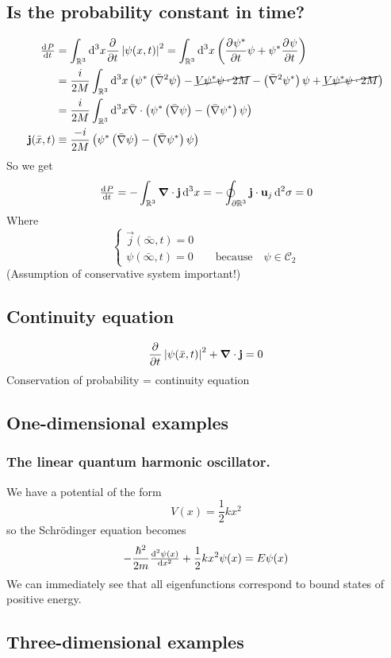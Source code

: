 \subsection{Is the probability constant in time?}
\begin{align*}
\od{P}{t} &= \int_{\R^3}\diff{^3x}\pd{}{t}\left|\psi(x,t)\right|^2 = \int_{\R^3}\diff{^3x}\left(\pd{\psi^*}{t}\psi + \psi^*\pd{\psi}{t}\right) \\
&= \frac{i}{2M}\int_{\R^3} \diff{^3x}\left(\psi^*\left(\bar{\nabla}^2\psi\right)- \cancel{V\psi^*\psi\cdot2M} - \left(\bar{\nabla}^2\psi^*\right)\psi + \cancel{V\psi^*\psi\cdot2M}\right) \\
&= \frac{i}{2M}\int_{\R^3}\diff{^3x}\bar{\nabla}\cdot \left(\psi^*\left(\bar{\nabla}\psi\right)- \left(\bar{\nabla}\psi^*\right)\psi\right) \\
\vec{j}(\bar{x},t) &\equiv \frac{-i}{2M}\left(\psi^*\left(\bar{\nabla}\psi\right)- \left(\bar{\nabla}\psi^*\right)\psi\right)
\end{align*}
So we get
\[ \od{P}{t} = -\int_{\R^3}\vec{\nabla}\cdot \vec{j}\diff{^3x} = -\oint_{\partial \R^3} \vec{j}\cdot \vec{u}_j \diff{^2\sigma} = 0 \]
Where
\[ \begin{cases}
\vec{j}(\bar{\infty},t) = 0\\
\psi(\bar{\infty},t) = 0 \qquad \text{because} \quad \psi \in \mathcal{C}_2
\end{cases} \]
(Assumption of conservative system important!)
\subsection{Continuity equation}
\[  \frac{\partial{^{}}}{\partial{{t}^{}}} \left|\psi(\bar{x},t)\right|^2 + \boldsymbol{\mathrm{\nabla}}\cdot\boldsymbol{\mathrm{j}} = 0 \]
Conservation of probability = continuity equation

\subsection{One-dimensional examples}
\subsubsection{The linear quantum harmonic oscillator.}
We have a potential of the form
\[ V(x) = \frac{1}{2}kx^2 \]
so the Schrödinger equation becomes
\[ - \frac{\hbar^2}{2m}\od[2]{\psi(x)}{x} + \frac{1}{2}kx^2\psi(x) = E\psi(x) \]
We can immediately see that all eigenfunctions correspond to bound states of positive energy.
\subsection{Three-dimensional examples}



